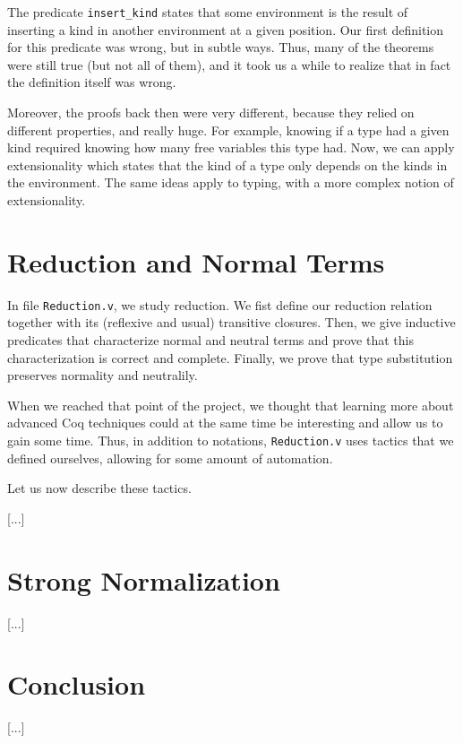 \documentclass[a4paper,11pt]{article}
\begin{document}
The predicate \verb|insert_kind| states that some environment is the
result of inserting a kind in another environment at a given position.
Our first definition for this predicate was wrong, but in subtle
ways. Thus, many of the theorems were still true (but not all of
them), and it took us a while to realize that in fact the definition
itself was wrong.

Moreover, the proofs back then were very different, because they
relied on different properties, and really huge. For example,
knowing if a type had a given kind required knowing how many free
variables this type had. Now, we can apply extensionality which
states that the kind of a type only depends on the kinds in the
environment. The same ideas apply to typing, with a more complex
notion of extensionality.

\section{Reduction and Normal Terms}

In file \verb|Reduction.v|, we study reduction. We fist define our
reduction relation together with its (reflexive and usual) transitive
closures. Then, we give inductive predicates that characterize normal
and neutral terms and prove that this characterization is correct and
complete. Finally, we prove that type substitution preserves normality
and neutralily.

When we reached that point of the project, we thought that learning
more about advanced Coq techniques could at the same time be
interesting and allow us to gain some time. Thus, in addition to
notations, \verb|Reduction.v| uses tactics that we defined ourselves,
allowing for some amount of automation.

Let us now describe these tactics.

[...]

\section{Strong Normalization}

[...]

\section*{Conclusion}

[...]
\end{document}
